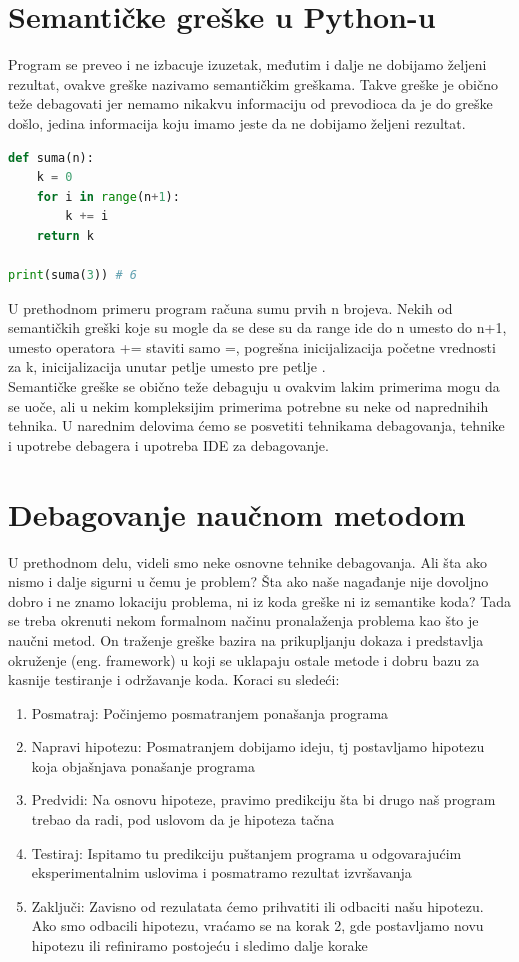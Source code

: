\documentclass[a4paper]{article}
\begin{document}
\section{Semantičke greške u Python-u}	
Program se preveo i ne izbacuje izuzetak, međutim i dalje ne dobijamo željeni rezultat, ovakve greške nazivamo semantičkim greškama. Takve greške je obično teže debagovati jer nemamo nikakvu informaciju od prevodioca da je do greške došlo, jedina informacija koju imamo jeste da ne dobijamo željeni rezultat. 
\begin{lstlisting}[language = python, caption = {Funkcija koja računa sumu prvih n brojeva}]
def suma(n):
    k = 0
    for i in range(n+1):
        k += i
    return k

print(suma(3)) # 6
\end{lstlisting}
U prethodnom primeru program računa sumu prvih n brojeva. Nekih od semantičkih greški koje su mogle da se dese su da range ide do n umesto do n+1, umesto operatora += staviti samo =, pogrešna inicijalizacija početne vrednosti za k, inicijalizacija unutar petlje umesto pre petlje \cite{proPyDeb}.\\
Semantičke greške se obično teže debaguju u ovakvim lakim primerima mogu da se uoče, ali u nekim kompleksijim primerima potrebne su neke od naprednihih tehnika. U narednim delovima ćemo se posvetiti tehnikama debagovanja, tehnike i upotrebe debagera i upotreba IDE za debagovanje.

\section{Debagovanje naučnom metodom}
U prethodnom delu, videli smo neke osnovne tehnike debagovanja. Ali šta ako nismo i dalje sigurni u čemu je problem? Šta ako naše nagađanje nije dovoljno dobro i ne znamo lokaciju problema, ni iz koda greške ni iz semantike koda? Tada se treba okrenuti nekom formalnom načinu pronalaženja problema kao što je naučni metod. On traženje greške bazira na prikupljanju dokaza i predstavlja okruženje (eng. framework) u koji se uklapaju ostale metode i dobru bazu za kasnije testiranje i održavanje koda.
	 Koraci su sledeći\cite{proPyDeb}:
	 \begin{enumerate}
	     \item Posmatraj: Počinjemo posmatranjem ponašanja programa 
	     \item Napravi hipotezu: Posmatranjem dobijamo ideju, tj postavljamo hipotezu koja objašnjava ponašanje programa
	     \item Predvidi: Na osnovu hipoteze, pravimo predikciju šta bi drugo naš program trebao da radi, pod uslovom da je hipoteza tačna
	     \item Testiraj: Ispitamo tu predikciju puštanjem programa u odgovarajućim eksperimentalnim uslovima i posmatramo rezultat izvršavanja
	     \item Zaključi: Zavisno od rezulatata ćemo prihvatiti ili odbaciti našu hipotezu. Ako smo odbacili hipotezu, vraćamo se na korak 2, gde postavljamo novu hipotezu ili refiniramo postojeću i sledimo dalje korake
	 \end{enumerate}
\end{document}
